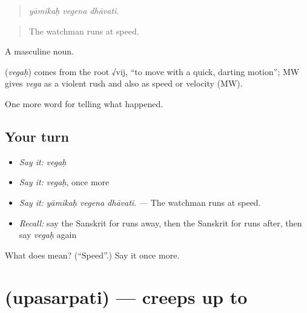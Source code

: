\begin{quote}
  
\end{quote}

\begin{quote}
\emph{yāmikaḥ vegena dhāvati.}
\end{quote}

\begin{quote}
The watchman runs at speed.
\end{quote}

A masculine noun.

\begin{cousinweb}
\textbf{} (\emph{vegaḥ}) comes from the root √vij, \textquotedblleft{}to move with a quick, darting motion\textquotedblright{}; MW gives \emph{vega} as a violent rush and also as speed or velocity (MW).
\end{cousinweb}

\begin{grammarlens}[title={What you've built}]
One more word for telling what happened.
\end{grammarlens}

\subsection*{Your turn}
\begin{itemize}
\raggedright
  \item \emph{Say it:} \emph{vegaḥ}
  \item \emph{Say it:} \emph{vegaḥ}, once more
  \item \emph{Say it:} \emph{yāmikaḥ vegena dhāvati.} — The watchman runs at speed.
  \item \emph{Recall:} say the Sanskrit for runs away, then the Sanskrit for runs after, then say \emph{vegaḥ} again
\end{itemize}

\begin{tcolorbox}[breakable,colback=teal!4,colframe=teal!35!black,title={Before you move on}]
What does  mean? (\textquotedblleft{}Speed\textquotedblright{}.) Say it once more.
\end{tcolorbox}
\section[\texorpdfstring{\sk{उपसर्पति} (upasarpati)}{उपसर्पति (upasarpati)}]{ (upasarpati) — creeps up to}

\label{lesson:SA-C287-upasarpati}



